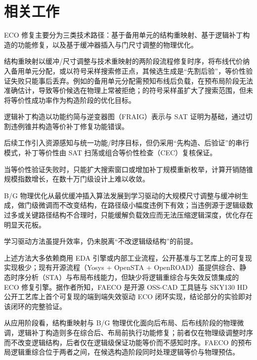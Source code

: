 \documentclass[twocolumn,10pt]{ctexart}
\begin{document}
\section{相关工作}

ECO 修复主要分为三类技术路径：基于备用单元的结构重映射、基于逻辑补丁构造的功能修复，以及基于缓冲器插入与门尺寸调整的物理优化。

结构重映射以缓冲/尺寸调整与技术重映射的两阶段流程修复时序，将布线代价纳入备用单元分配\cite{ho2010eco,ho2012treco}，或以符号采样搜索修正点\cite{kravets2019symbolic}，其候选生成是“先割后验”，等价性验证失败只能事后丢弃。例如\cite{ho2010eco}的备用单元分配需预知布线后负载，在预布局阶段无法准确估计，导致等价候选在物理上常被拒绝；\cite{kravets2019symbolic}的符号采样虽扩大了搜索范围，但未将等价性成功率作为构造阶段的优化目标。

逻辑补丁构造以功能约简与逆变器图（FRAIG）表示与 SAT 证明为基础，通过切割违例锥并构造等价补丁修复功能错误\cite{jiang2010fraig,jiang2016resource}。

后续工作引入资源感知\cite{jiang2016resource}与统一功能/时序目标\cite{lin2011simult,luo2016unified}，但仍采用“先构造、后验证”的串行模式，补丁等价性由 SAT 扫荡或组合等价性检查（CEC）复核保证\cite{mishchenko2006sat,zhong2024stp}。

当等价性验证失败时，只能扩大搜索窗口或增加补丁规模重新枚举\cite{zhuo2018patch}，计算开销随锥规模指数增长，在数十万门级设计上难以收敛。

B/G 物理优化从最优缓冲插入算法\cite{liang2012buffer}发展到学习驱动的大规模尺寸调整与缓冲树生成\cite{liu2021rlsizer,huang2025phys,chen2024aito,zhang2025buffalo}，做门级微调而不改变结构，在路径级小幅度违例下有效；当违例源于逻辑级数过多或关键路径结构不合理时，只能缓解负载效应而无法压缩逻辑深度，优化存在明显天花板\cite{liu2021rlsizer,huang2025phys}。

学习驱动方法\cite{chen2024aito,zhang2025buffalo}虽提升效率，仍未脱离“不改逻辑级结构”的前提。

上述方法大多依赖商用 EDA 引擎或内部工业流程，公开基准与工艺库上的可复现实现极少；现有开源流程（Yosys\cite{yosys} + OpenSTA\cite{opensta} + OpenROAD\cite{openroad}）虽提供综合、静态时序分析（STA）与布局布线能力，但缺少将逻辑重综合与失效反馈集成的 ECO 修复引擎。据作者所知，FAECO 是开源 OSS-CAD 工具链与 SKY130 HD\cite{sky130} 公开工艺库上首个可复现的端到端失效驱动 ECO 闭环实现，结论部分的实验即对该闭环的完整验证。

从应用阶段看，结构重映射与 B/G 物理优化面向后布局、后布线阶段的物理微调，逻辑补丁构造则多在综合后、布局前执行功能修复；前者仅在物理级调整时序而不改变逻辑结构，后者仅在逻辑级保证功能等价而不感知时序。FAECO 的预布局逻辑重综合位于两者之间，在候选构造阶段同时处理逻辑等价与物理预估。
\end{document}
